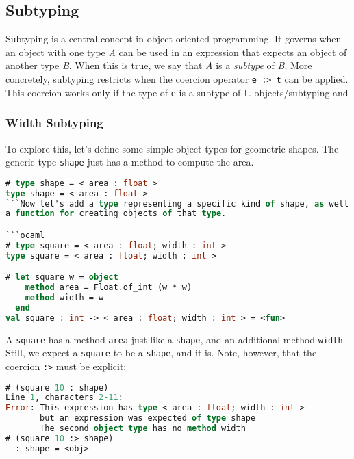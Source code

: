 \hypertarget{subtyping}{%
\subsection{Subtyping}\label{subtyping}}

Subtyping is a central concept in object-oriented programming. It
governs when an object with one type \emph{A} can be used in an
expression that expects an object of another type \emph{B}. When this is
true, we say that \emph{A} is a \emph{subtype} of \emph{B}. More
concretely, subtyping restricts when the coercion operator
\passthrough{\lstinline!e :> t!} can be applied. This coercion works
only if the type of \passthrough{\lstinline!e!} is a subtype of
\passthrough{\lstinline!t!}.
\protect\hypertarget{OBsub}{}{objects/subtyping
and}

\hypertarget{width-subtyping}{%
\subsubsection{Width Subtyping}\label{width-subtyping}}

To explore this, let's define some simple object types for geometric
shapes. The generic type \passthrough{\lstinline!shape!} just has a
method to compute the area.

\begin{lstlisting}[language=Caml]
# type shape = < area : float >
type shape = < area : float >
```Now let's add a type representing a specific kind of shape, as well as
a function for creating objects of that type.

```ocaml
# type square = < area : float; width : int >
type square = < area : float; width : int >

# let square w = object
    method area = Float.of_int (w * w)
    method width = w
  end
val square : int -> < area : float; width : int > = <fun>
\end{lstlisting}

A \passthrough{\lstinline!square!} has a method
\passthrough{\lstinline!area!} just like a
\passthrough{\lstinline!shape!}, and an additional method
\passthrough{\lstinline!width!}. Still, we expect a
\passthrough{\lstinline!square!} to be a
\passthrough{\lstinline!shape!}, and it is. Note, however, that the
coercion \passthrough{\lstinline!:>!} must be explicit:

\begin{lstlisting}[language=Caml]
# (square 10 : shape)
Line 1, characters 2-11:
Error: This expression has type < area : float; width : int >
       but an expression was expected of type shape
       The second object type has no method width
# (square 10 :> shape)
- : shape = <obj>
\end{lstlisting}

